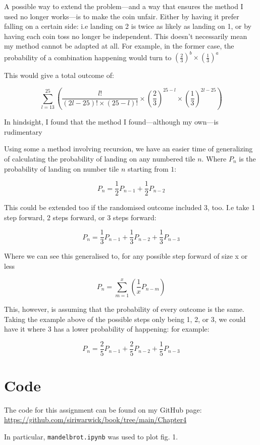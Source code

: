 \documentclass[11pt]{article}
\newcommand{\keywordfont}{\textsc}
\newcommand{\keyword}[1]{%
  \marginpar{\raggedright\small\keywordfont{#1}}}
\begin{document}
A possible way to extend the problem—and a way \keyword{Extension}that ensures the method I used no longer works—is to make the coin unfair. Either by having it prefer falling on a certain side: i.e landing on 2 is twice as likely as landing on 1, or by having each coin toss no longer be independent. This doesn’t necessarily mean my method cannot be adapted at all. For example, in the former case, the probability of a combination happening would turn to $\left( \frac{2}{3} \right) ^b \times \left( \frac{1}{3} \right) ^a$

This would give a total outcome of:


\[
\sum_{l=13}^{25} \left( \frac{l!}{ (2l -25)! \times (25-l)!} \times \left( \frac{2}{3} \right) ^{25-l} \times \left( \frac{1}{3} \right) ^{2l - 25} \right)
\]

In hindsight, I found that the method I found—although my own—is rudimentary


Using some a method involving recursion, \keyword{Generalise} we have an easier time of generalizing of calculating the probability of landing on any numbered tile $n$. Where $P_n$ is the probability of landing on number tile $n$ starting from $1$:

$$P_n = \frac{1}{2} P_{n-1} + \frac{1}{2} P_{n-2}$$

This could be extended too if the randomised outcome included 3, too. I.e take 1 step forward, 2 steps forward, or 3 steps forward:

$$P_n = \frac{1}{3} P_{n-1} + \frac{1}{3} P_{n-2} + \frac{1}{3} P_{n-3}$$

Where we can see this generalised to, for any possible step forward of size x or less


\[
P_n = \sum_{m=1}^{x} \left( \frac{1}{x} P_{n-m} \right)
\]

This, however, is assuming that the probability of every outcome is the same. Taking the example above of the possible steps only being 1, 2, or 3, we could have it where 3 has a lower probability of happening: for example:

$$P_n = \frac{2}{5} P_{n-1} + \frac{2}{5} P_{n-2} + \frac{1}{5} P_{n-3}$$




\section*{Code}
The code for this assignment can be found on my GitHub page:\\  
\url{https://github.com/siriwarwick/book/tree/main/Chapter4}

In particular, \texttt{mandelbrot.ipynb} was used to plot fig. 1.
\end{document}
